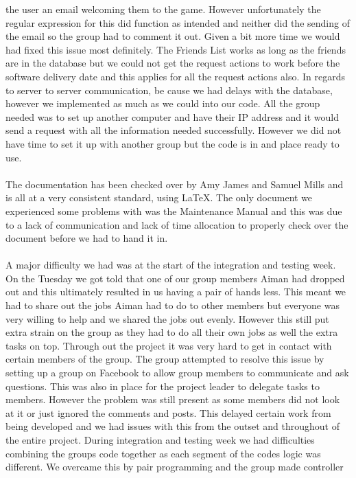 \documentclass[titlepage]{article}
\begin{document}
{the user an email welcoming them to the game. However unfortunately the regular expression for this did
function as intended and neither did the sending of the email so the group had to comment it out. Given a bit
more time we would had fixed this issue most definitely. The Friends List works as long as the friends are
in the database but we could not get the request actions to work before the software delivery date and this applies for
all the request actions also. In regards to server to server communication, be cause we had delays
with the database, however we implemented as much as we could into our code. All the group needed was
to set up another computer and have their IP address and it would send a request with all the
information needed successfully. However we did not have time to set it up with another group but the
code is in and place ready to use.
\\
\\
The documentation has been checked over by Amy James and Samuel Mills and is all at a very consistent
standard, using \LaTeX. The only document we experienced some problems with was the Maintenance Manual and
this was due to a lack of communication and lack of time allocation to properly check over the
document before we had to hand it in.
\\
\\
A major difficulty we had was at the start of the integration and testing week. On the Tuesday we got
told that one of our group members Aiman had dropped out and this ultimately resulted in us having a pair of hands less. This meant we had to
share out the jobs Aiman had to do to other members but everyone was very willing to help and we shared the jobs out
evenly. However this still put extra strain on the group as they had to do all their own jobs as well the extra tasks on top.
Through out the project it was very hard to get in contact with certain members of the group. The group attempted to resolve
this issue by setting up a group on Facebook to allow group members to communicate and ask questions. This was also in place for the project leader to delegate
tasks to members. However the problem was still present as some members
did not look at it or just ignored the comments and posts. This delayed certain work from being developed and we had issues with this from the outset and throughout of the entire project.
During integration and testing week we had difficulties combining the groups
code together as each segment of the codes logic was different. We
overcame this by pair programming and the group made controller
}
\end{document}
